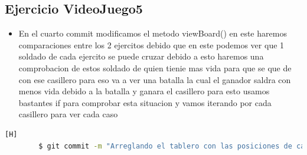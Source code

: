\documentclass{article}
\begin{document}
	\subsection{Ejercicio VideoJuego5}
	\begin{itemize}	
		\item En el cuarto commit modificamos el metodo viewBoard() en este haremos comparaciones entre los 2 ejercitos debido que en este podemos ver que 1 soldado de cada ejercito se puede cruzar debido a esto haremos una comprobacion de estos soldado de quien tienie mas vida para que se que de con ese casillero para eso va a ver una batalla la cual el ganador saldra con menos vida debido a la batalla y ganara el casillero para esto usamos bastantes if para comprobar esta situacion y vamos iterando por cada casillero para ver cada caso
	\end{itemize}	
	\begin{lstlisting}[language=bash,caption={Commit}][H]
		$ git commit -m "Arreglando el tablero con las posiciones de cada bando de cada ejercito en caso de que soldados de diferente ejercito se encuentren en el mismo casillero estos van a tener una batalla como vemos en la que se compara su nivel de vida y el que tenga mas vida se posicionara donde esta siendo este el ganador pero su vida se reducira debido laa batalla tenida con el otro soldado el cual va a ser eliminado del campo"
	\end{lstlisting}	
\end{document}
